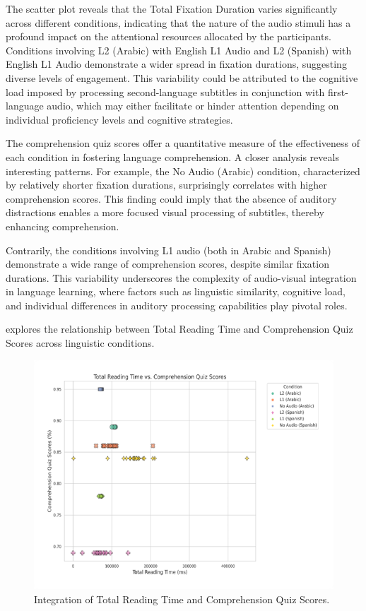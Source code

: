 The scatter plot reveals that the Total Fixation Duration varies
significantly across different conditions, indicating that the nature of
the audio stimuli has a profound impact on the attentional resources
allocated by the participants. Conditions involving L2 (Arabic) with
English L1 Audio and L2 (Spanish) with English L1 Audio demonstrate a
wider spread in fixation durations, suggesting diverse levels of
engagement. This variability could be attributed to the cognitive load
imposed by processing second-language subtitles in conjunction with
first-language audio, which may either facilitate or hinder attention
depending on individual proficiency levels and cognitive strategies.

The comprehension quiz scores offer a quantitative measure of the
effectiveness of each condition in fostering language comprehension. A
closer analysis reveals interesting patterns. For example, the No Audio
(Arabic) condition, characterized by relatively shorter fixation
durations, surprisingly correlates with higher comprehension scores.
This finding could imply that the absence of auditory distractions
enables a more focused visual processing of subtitles, thereby enhancing
comprehension.

Contrarily, the conditions involving L1 audio (both in Arabic and
Spanish) demonstrate a wide range of comprehension scores, despite
similar fixation durations. This variability underscores the complexity
of audio-visual integration in language learning, where factors such as
linguistic similarity, cognitive load, and individual differences in
auditory processing capabilities play pivotal roles.

 explores the relationship between Total Reading Time and
Comprehension Quiz Scores across linguistic conditions.

\begin{figure}[htbp]
\centering
\caption{Integration of Total Reading Time and Comprehension Quiz Scores.}
\label{fig-05}
\includegraphics[width=\textwidth]{image5}
\end{figure}

